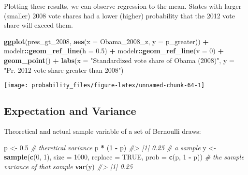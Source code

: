\documentclass[]{book}
\newenvironment{Shaded}{\begin{snugshade}}{\end{snugshade}}
\newcommand{\KeywordTok}[1]{\textcolor[rgb]{0.13,0.29,0.53}{\textbf{#1}}}
\newcommand{\DataTypeTok}[1]{\textcolor[rgb]{0.13,0.29,0.53}{#1}}
\newcommand{\DecValTok}[1]{\textcolor[rgb]{0.00,0.00,0.81}{#1}}
\newcommand{\FloatTok}[1]{\textcolor[rgb]{0.00,0.00,0.81}{#1}}
\newcommand{\StringTok}[1]{\textcolor[rgb]{0.31,0.60,0.02}{#1}}
\newcommand{\CommentTok}[1]{\textcolor[rgb]{0.56,0.35,0.01}{\textit{#1}}}
\newcommand{\OtherTok}[1]{\textcolor[rgb]{0.56,0.35,0.01}{#1}}
\newcommand{\OperatorTok}[1]{\textcolor[rgb]{0.81,0.36,0.00}{\textbf{#1}}}
\newcommand{\NormalTok}[1]{#1}
\theoremstyle{definition}
\theoremstyle{definition}
\theoremstyle{definition}
\theoremstyle{remark}
\begin{document}
Plotting these results, we can observe regression to the mean. States
with larger (smaller) 2008 vote shares had a lower (higher) probability
that the 2012 vote share will exceed them.

\begin{Shaded}
\begin{Highlighting}[]
\KeywordTok{ggplot}\NormalTok{(pres_gt_}\DecValTok{2008}\NormalTok{, }\KeywordTok{aes}\NormalTok{(}\DataTypeTok{x =}\NormalTok{ Obama_2008_z, }\DataTypeTok{y =}\NormalTok{ p_greater)) }\OperatorTok{+}
\StringTok{  }\NormalTok{modelr}\OperatorTok{::}\KeywordTok{geom_ref_line}\NormalTok{(}\DataTypeTok{h =} \FloatTok{0.5}\NormalTok{) }\OperatorTok{+}
\StringTok{  }\NormalTok{modelr}\OperatorTok{::}\KeywordTok{geom_ref_line}\NormalTok{(}\DataTypeTok{v =} \DecValTok{0}\NormalTok{) }\OperatorTok{+}
\StringTok{  }\KeywordTok{geom_point}\NormalTok{() }\OperatorTok{+}
\StringTok{  }\KeywordTok{labs}\NormalTok{(}\DataTypeTok{x =} \StringTok{"Standardized vote share of Obama (2008)"}\NormalTok{,}
       \DataTypeTok{y =} \StringTok{"Pr. 2012 vote share greater than 2008"}\NormalTok{)}
\end{Highlighting}
\end{Shaded}

\begin{center}\texttt{[image: probability\_files/figure-latex/unnamed-chunk-64-1]} \end{center}

\subsection{Expectation and Variance}\label{expectation-and-variance}

Theoretical and actual sample variable of a set of Bernoulli draws:

\begin{Shaded}
\begin{Highlighting}[]
\NormalTok{p <-}\StringTok{ }\FloatTok{0.5}
\CommentTok{# theretical variance}
\NormalTok{p }\OperatorTok{*}\StringTok{ }\NormalTok{(}\DecValTok{1} \OperatorTok{-}\StringTok{ }\NormalTok{p)}
\CommentTok{#> [1] 0.25}
\CommentTok{# a sample}
\NormalTok{y <-}\StringTok{ }\KeywordTok{sample}\NormalTok{(}\KeywordTok{c}\NormalTok{(}\DecValTok{0}\NormalTok{, }\DecValTok{1}\NormalTok{), }\DataTypeTok{size =} \DecValTok{1000}\NormalTok{, }\DataTypeTok{replace =} \OtherTok{TRUE}\NormalTok{, }\DataTypeTok{prob =} \KeywordTok{c}\NormalTok{(p, }\DecValTok{1} \OperatorTok{-}\StringTok{ }\NormalTok{p))}
\CommentTok{# the sample variance of that sample}
\KeywordTok{var}\NormalTok{(y)}
\CommentTok{#> [1] 0.25}
\end{Highlighting}
\end{Shaded}
\end{document}

